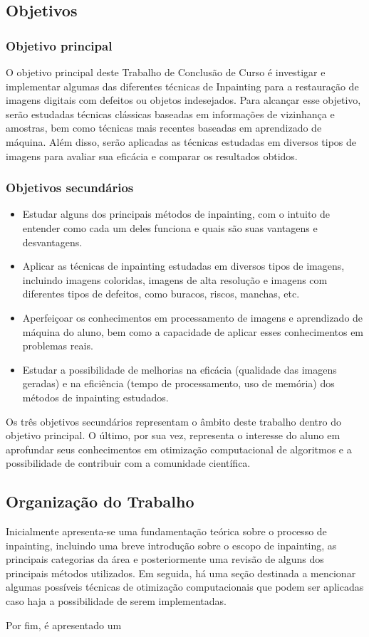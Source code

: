 \subsection{Objetivos}

\subsubsection{Objetivo principal}
O objetivo principal deste Trabalho de Conclusão de Curso é investigar e implementar algumas das diferentes técnicas de Inpainting para a restauração de imagens digitais com defeitos ou objetos indesejados. Para alcançar esse objetivo, serão estudadas técnicas clássicas baseadas em informações de vizinhança e amostras, bem como técnicas mais recentes baseadas em aprendizado de máquina. Além disso, serão aplicadas as técnicas estudadas em diversos tipos de imagens para avaliar sua eficácia e comparar os resultados obtidos.

\subsubsection{Objetivos secundários}
\begin{itemize}
  \item Estudar alguns dos principais métodos de inpainting, com o intuito de entender como cada um deles funciona e quais são suas vantagens e desvantagens.
  \item Aplicar as técnicas de inpainting estudadas em diversos tipos de imagens, incluindo imagens coloridas, imagens de alta resolução e imagens com diferentes tipos de defeitos, como buracos, riscos, manchas, etc.
  \item Aperfeiçoar os conhecimentos em processamento de imagens e aprendizado de máquina do aluno, bem como a capacidade de aplicar esses conhecimentos em problemas reais.
  \item Estudar a possibilidade de melhorias na eficácia (qualidade das imagens geradas) e na eficiência (tempo de processamento, uso de memória) dos métodos de inpainting estudados.
\end{itemize}

Os três objetivos secundários representam o âmbito deste trabalho dentro do objetivo principal. O último, por sua vez, representa o interesse do aluno em aprofundar seus conhecimentos em otimização computacional de algoritmos e a possibilidade de contribuir com a comunidade científica.

\subsection{Organização do Trabalho}
Inicialmente apresenta-se uma fundamentação teórica sobre o processo de inpainting, incluindo uma breve introdução sobre o escopo de inpainting, as principais categorias da área e posteriormente uma revisão de alguns dos principais métodos utilizados.
Em seguida, há uma seção destinada a mencionar algumas possíveis técnicas de otimização computacionais que podem ser aplicadas caso haja a possibilidade de serem implementadas.

Por fim, é apresentado um 